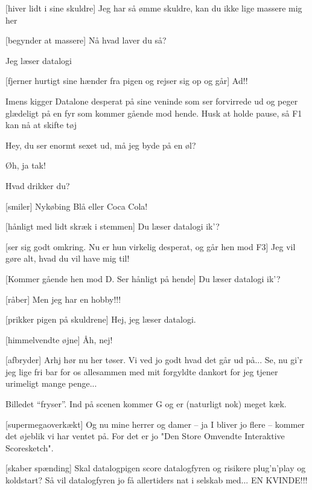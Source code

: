 \documentclass[danish]{article}
\begin{document}
\begin{sketch}
[hiver lidt i sine skuldre] Jeg har så ømme skuldre, kan du ikke
lige
massere mig her 

[begynder at massere] Nå hvad laver du så?

 Jeg læser datalogi 

[fjerner hurtigt sine hænder fra pigen og rejser sig op og går]
Ad!! 

\scene Imens kigger Datalone desperat på sine veninde som ser forvirrede ud og
peger glædeligt på en fyr som kommer gående mod hende. Husk at holde pause, så F1 kan nå at skifte tøj

 Hey, du ser enormt sexet ud, må jeg byde på en øl?

 Øh, ja tak!

 Hvad drikker du?

[smiler] Nykøbing Blå eller Coca Cola!

[hånligt med lidt skræk i stemmen] Du læser datalogi ik'?

[ser sig godt omkring. Nu er hun virkelig desperat, og går hen mod F3]
Jeg vil gøre alt, hvad du vil have mig til!

[Kommer gående hen mod D. Ser hånligt på hende] Du læser datalogi ik'? 

[råber] Men jeg har en hobby!!!

[prikker pigen på skuldrene] Hej, jeg læser datalogi. 

[himmelvendte øjne] Åh, nej! 

[afbryder] Arhj hør nu her tøser. Vi ved jo godt hvad det
går ud på... Se, nu gi'r jeg lige fri bar for os allesammen med mit
forgyldte dankort  for jeg tjener urimeligt mange
penge...

\scene Billedet ``fryser''. Ind på scenen kommer G og er (naturligt nok)
meget kæk.

[supermegaoverkækt] Og nu mine herrer og damer -- ja I bliver jo
flere -- kommer det øjeblik vi har ventet på. For det er jo "Den Store
Omvendte Interaktive Scoresketch".

[skaber spænding] Skal datalogpigen score datalogfyren og risikere
plug'n'play og koldstart? Så vil datalogfyren jo få allertiders nat i
selskab med...  EN KVINDE!!!


\end{sketch}
\end{document}

